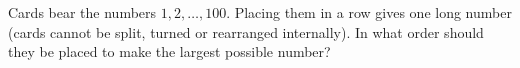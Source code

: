 Cards bear the numbers $1,2,\dots,100$. Placing them in a row gives one long number (cards cannot be split, turned or rearranged internally). In what order should they be placed to make the largest possible number?
